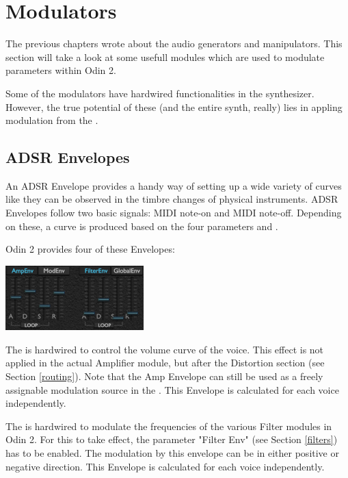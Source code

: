 \chapter{Modulators}
The previous chapters wrote about the audio generators and manipulators. This section will take a look at some usefull modules which are used to modulate parameters within Odin 2.

Some of the modulators have hardwired functionalities in the synthesizer. However, the true potential of these (and the entire synth, really) lies in appling modulation from the \modmatrix.

\section{ADSR Envelopes}
\label{ADSR}
An ADSR Envelope provides a handy way of setting up a wide variety of curves like they can be observed in the timbre changes of physical instruments. ADSR Envelopes follow two basic signals: MIDI note-on and MIDI note-off. Depending on these, a curve is produced based on the four parameters  and .

Odin 2 provides four of these Envelopes:

\begin{center}
    \includegraphics[width=0.4\textwidth]{graphics/ADSR_section.png}
\end{center}

The  is hardwired to control the volume curve of the voice. This effect is not applied in the actual Amplifier module, but after the Distortion section (see Section \ref{routing}). Note that the Amp Envelope can still be used as a freely assignable modulation source in the \modmatrix. This Envelope is calculated for each voice independently.
\label{amp_env}

The  is hardwired to modulate the frequencies of the various Filter modules in Odin 2. For this to take effect, the parameter "Filter Env" (see Section \ref{filters}) has to be enabled. The modulation by this envelope can be in either positive or negative direction. This Envelope is calculated for each voice independently.

